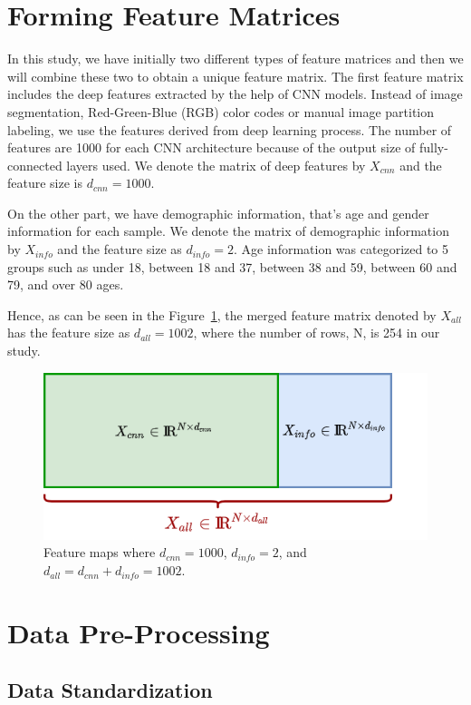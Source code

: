 \section{Forming Feature Matrices} \label{sec:CH5_forming_features}

In this study, we have initially two different types of feature matrices and then we will combine these two to obtain a unique feature matrix. The first feature matrix includes the deep features extracted by the help of CNN models. Instead of image segmentation, Red-Green-Blue (RGB) color codes or manual image partition labeling, we use the features derived from deep learning process. The number of features are 1000 for each CNN architecture because of the output size of fully-connected layers used. We denote the matrix of deep features by $X_{cnn}$ and the feature size is $d_{cnn} = 1000$.

On the other part, we have demographic information, that's age and gender information for each sample. We denote the matrix of demographic information by $X_{info}$ and the feature size as $d_{info} = 2$. Age information was categorized to 5 groups such as under 18, between 18 and 37, between 38 and 59, between 60 and 79, and over 80 ages.

Hence, as can be seen in the Figure~\ref{fig:feature_maps}, the merged feature matrix denoted by $X_{all}$ has the feature size as $d_{all} = 1002$, where the number of rows, N, is 254 in our study.

\begin{figure}[h]
	\centering
	\includegraphics[width=.6\linewidth]{fig/feature_maps.png}
	\vspace{2mm}
	\caption{Feature maps where $d_{cnn} = 1000$, $d_{info} = 2$, and $d_{all} = d_{cnn} + d_{info} = 1002$.}
	\label{fig:feature_maps}
\end{figure}

\section{Data Pre-Processing}

\subsection{Data Standardization}

